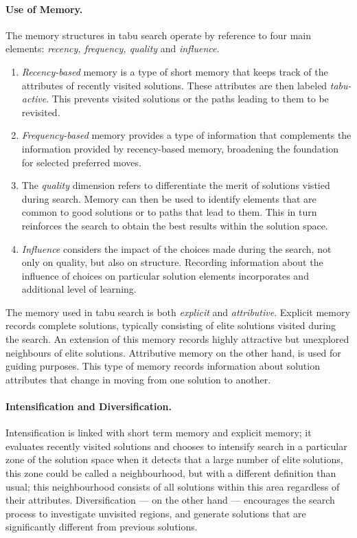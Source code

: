 \paragraph{Use of Memory.} The memory structures in tabu search operate by reference to four main elements: \emph{recency, frequency, quality} and \emph{influence}.

\begin{enumerate}
\item \emph{Recency-based} memory is a type of short memory that keeps track of the attributes of recently visited solutions. These attributes are then labeled \emph{tabu-active}. This prevents visited solutions or the paths leading to them to be revisited.
\item \emph{Frequency-based} memory provides a type of information that complements the information provided by recency-based memory, broadening the foundation for selected preferred moves.
\item The \emph{quality} dimension refers to differentiate the merit of solutions vistied during search. Memory can then be used to identify elements that are common to good solutions or to paths that lead to them. This in turn reinforces the search to obtain the best results within the solution space.  
\item \emph{Influence} considers the impact of the choices made during the search, not only on quality, but also on structure. Recording information about the influence of choices on particular solution elements incorporates and additional level of learning.
\end{enumerate}

The memory used in tabu search is both \emph{explicit} and \emph{attributive}. Explicit memory records complete solutions, typically consisting of elite solutions visited during the search. An extension of this memory records highly attractive but unexplored neighbours of elite solutions. Attributive memory on the other hand, is used for guiding purposes. This type of memory records information about solution attributes that change in moving from one solution to another.

\paragraph{Intensification and Diversification.} Intensification is linked with short term memory and explicit memory; it evaluates recently visited solutions and chooses to intensify search in a particular zone of the solution space when it detects that a large number of elite solutions, this zone could be called a neighbourhood, but with a different definition than usual; this neighbourhood consists of all solutions within this area regardless of their attributes. Diversification --- on the other hand --- encourages the search process to investigate unvisited regions, and generate solutions that are significantly different from previous solutions.

